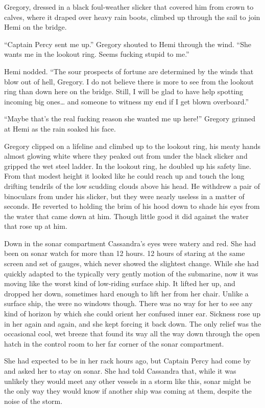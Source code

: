 \documentclass[]{scrbook}
\begin{document}
Gregory, dressed in a black foul-weather slicker that covered him from
crown to calves, where it draped over heavy rain boots, climbed up
through the sail to join Hemi on the bridge.

``Captain Percy sent me up.'' Gregory shouted to Hemi through the wind.
``She wants me in the lookout ring. Seems fucking stupid to me.''

Hemi nodded. ``The sour prospects of fortune are determined by the winds
that blow out of hell, Gregory. I do not believe there is more to see
from the lookout ring than down here on the bridge. Still, I will be
glad to have help spotting incoming big ones\ldots{} and someone to
witness my end if I get blown overboard.''

``Maybe that's the real fucking reason she wanted me up here!'' Gregory
grinned at Hemi as the rain soaked his face.

Gregory clipped on a lifeline and climbed up to the lookout ring, his
meaty hands almost glowing white where they peaked out from under the
black slicker and gripped the wet steel ladder. In the lookout ring, he
doubled up his safety line. From that modest height it looked like he
could reach up and touch the long drifting tendrils of the low scudding
clouds above his head. He withdrew a pair of binoculars from under his
slicker, but they were nearly useless in a matter of seconds. He
reverted to holding the brim of his hood down to shade his eyes from the
water that came down at him. Though little good it did against the water
that rose up at him.

Down in the sonar compartment Cassandra's eyes were watery and red. She
had been on sonar watch for more than 12 hours. 12 hours of staring at
the same screen and set of gauges, which never showed the slightest
change. While she had quickly adapted to the typically very gently
motion of the submarine, now it was moving like the worst kind of
low-riding surface ship. It lifted her up, and dropped her down,
sometimes hard enough to lift her from her chair. Unlike a surface ship,
the were no windows though. There was no way for her to see any kind of
horizon by which she could orient her confused inner ear. Sickness rose
up in her again and again, and she kept forcing it back down. The only
relief was the occasional cool, wet breeze that found its way all the
way down through the open hatch in the control room to her far corner of
the sonar compartment.

She had expected to be in her rack hours ago, but Captain Percy had come
by and asked her to stay on sonar. She had told Cassandra that, while it
was unlikely they would meet any other vessels in a storm like this,
sonar might be the only way they would know if another ship was coming
at them, despite the noise of the storm.
\end{document}
